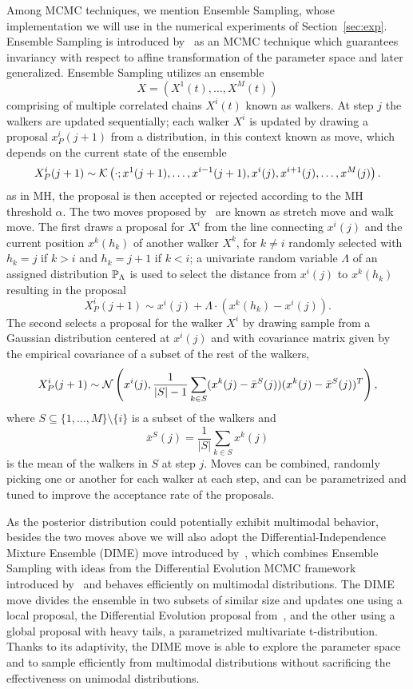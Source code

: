 Among MCMC techniques, we mention Ensemble Sampling, whose implementation we will use in the numerical experiments of Section~\ref{sec:exp}.
Ensemble Sampling is introduced by~\cite{GoodmanWeare} as an MCMC technique which guarantees invariancy with respect to affine transformation of the parameter space and later generalized.
Ensemble Sampling utilizes an ensemble 
\[
X =(X^1(t), \dots , X^M(t))
\] 
comprising of multiple correlated chains $X^i(t)$ known as walkers.
At step $j$ the walkers are updated sequentially; each walker $X^i$ is updated by drawing a proposal $x^i_P(j+1)$ from a distribution, in this context known as move, which depends on the current state of the ensemble 
\[
  X^i_P(j+1) \sim \mathcal K\left( \cdot ; x^1(j+1), \dots, x^{i-1}(j+1), x^i(j), x^{i+1}(j), \dots, x^M(j)\right).
\] as in MH, the proposal is then accepted or rejected according to the MH threshold $\alpha$. \newline
The two moves proposed by~\cite{GoodmanWeare} are known as stretch move and walk move.
The first draws a proposal for $X^i$ from the line connecting $x^i(j)$ and the current position $x^k(h_k)$ of another walker $X^k$, for $k \neq i$ randomly selected with $h_k = j$ if $k > i$ and $h_k = j+1$ if $k < i$; a univariate random variable $\Lambda$ of an assigned distribution $\mathbb P_\Lambda$ is used to select the distance from $x^i(j)$ to $x^k(h_k)$ resulting in the proposal
\begin{equation}\label{eq:stretch-move}
    X^i_P(j+1) \sim x^i(j) + \Lambda \cdot (x^k(h_k) - x^i(j)).
\end{equation}
The second selects a proposal for the walker $X^i$ by drawing sample from a Gaussian distribution centered at $x^i(j)$ and with covariance matrix given by the empirical covariance of a subset of the rest of the walkers,
\begin{equation}\label{eq:walk-move}
    X^i_P(j+1) \sim \mathcal N\left( x^i(j), \frac{1}{|S|-1} \sum_{k \in S} (x^k(j) - \bar x^S(j))(x^k(j) - \bar x^S(j))^T \right),
\end{equation}
where $S \subseteq \{1, \dots, M\} \setminus \{i\}$ is a subset of the walkers and \[\bar x^S(j) = \frac{1}{|S|}\sum_{k \in S} x^k(j)\] is the mean of the walkers in $S$ at step $j$.
Moves can be combined, randomly picking one or another for each walker at each step, and can be parametrized and tuned to improve the acceptance rate of the proposals.

As the posterior distribution could potentially exhibit multimodal behavior, besides the two moves above we will also adopt the Differential-Independence Mixture Ensemble (DIME) move introduced by~\cite{Boehl}, which combines Ensemble Sampling with ideas from the Differential Evolution MCMC framework introduced by~\cite{TerBraak} and behaves efficiently on multimodal distributions. 
The DIME move divides the ensemble in two subsets of similar size and updates one using a local proposal, the Differential Evolution proposal from~\cite{TerBraak}, and the other using a global proposal with heavy tails, a parametrized multivariate t-distribution.
Thanks to its adaptivity, the DIME move is able to explore the parameter space and to sample efficiently from multimodal distributions without sacrificing the effectiveness on unimodal distributions.

